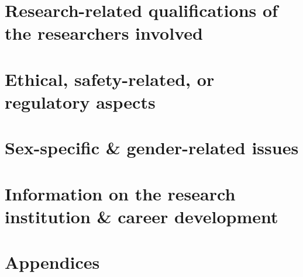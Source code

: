 \documentclass[11pt, a4paper, oneside, article]{memoir}
\begin{document}
\FloatBarrier

\chapter{Research-related qualifications of the researchers involved}


\chapter{Ethical, safety-related, or regulatory aspects}


\chapter{Sex-specific \& gender-related issues}


\chapter{Information on the research institution \& career development}
\label{c:info_dev}


\printglossary[type=\acronymtype,title={List of abbreviations},numberedsection]

\backmatter
\graphicspath{{appendices/}}              %
\appendix
\newpage
\chapter{Appendices}
\newpage
{}
\setcounter{page}{1}


\end{document}
